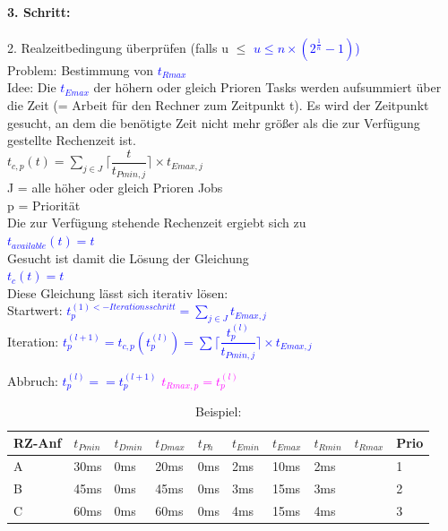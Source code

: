 \documentclass[12pt,a4paper,oneside,ngerman]{article}
\begin{document}
\paragraph{3. Schritt:}
2. Realzeitbedingung überprüfen (falls u $\leq$ \textcolor{blue}{\(u \leq n\times( 2^\frac{1}{n} - 1)\))}\\
Problem: Bestimmung von \textcolor{blue}{\(t_{Rmax}\)} \\
Idee: Die \textcolor{blue}{\(t_{Emax}\)} der höhern oder gleich Prioren Tasks werden aufsummiert über die Zeit (= Arbeit für den Rechner zum Zeitpunkt t).
Es wird der Zeitpunkt gesucht, an dem die benötigte Zeit nicht mehr größer als die zur Verfügung gestellte Rechenzeit ist.\\

\( t_{c,p}(t) = \displaystyle\sum_{j \in J} \Big\lceil \dfrac{t}{ t_{Pmin,j} } \Big\rceil \times t_{Emax,j} \)\\
J = alle höher oder gleich Prioren Jobs\\
p = Priorität\\

Die zur Verfügung stehende Rechenzeit ergiebt sich zu \\
\textcolor{blue}{\( t_{available}(t) = t \)}\\
Gesucht ist damit die Lösung der Gleichung\\
\textcolor{blue}{\( t_c(t) = t \)}\\
Diese Gleichung lässt sich iterativ lösen:\\
Startwert: \textcolor{blue}{ \(t_{p}^{(1)<-Iterationsschritt} = \displaystyle\sum_{j \in J} t_{Emax,j} \)}\\

Iteration: \textcolor{blue}{ \( t_{p}^{(l+1)} = t_{c,p}(t_{p}^{(l)}) = \displaystyle\sum \Big\lceil \dfrac{t_{p}^{(l)}}{ t_{Pmin,j} } \Big\rceil \times t_{Emax,j} \) }

Abbruch: \textcolor{blue}{ \( t_{p}^{(l)} == t_{p}^{(l+1)} \) }  \textcolor{magenta}{ \( t_{Rmax,p} = t_{p}^{(l)} \) }

\pagebreak
\begin{table}[H]
	\caption{Beispiel:}
	\begin{tabular}{|l|l|l|l|l|l|l|l|l|l|}
	\hline
	RZ-Anf & \(t_{Pmin}\) & \(t_{Dmin}\) & \(t_{Dmax}\) & \(t_{Ph}\) & \(t_{Emin}\) & \(t_{Emax}\) & \(t_{Rmin}\) & \(t_{Rmax}\) & Prio \\ \hline
	A      & 30ms         & 0ms          & 20ms         & 0ms        & 2ms          & 10ms         & 2ms          &              & 1    \\ \hline
	B      & 45ms         & 0ms          & 45ms         & 0ms        & 3ms          & 15ms         & 3ms          &              & 2    \\ \hline
	C      & 60ms         & 0ms          & 60ms         & 0ms        & 4ms          & 15ms         & 4ms          &              & 3    \\ \hline
	\end{tabular}
\end{table}
\end{document}

